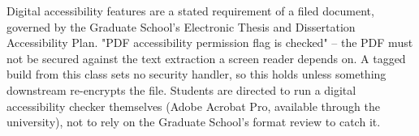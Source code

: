 %
%


\thesisrequiretagging
\thesisrequiredocumentlanguage
{}
	{Digital accessibility features are a stated requirement of a filed
	 document, governed by the Graduate School's Electronic Thesis and
	 Dissertation Accessibility Plan.}
	{"PDF accessibility permission flag is checked" -- the PDF must not be
	 secured against the text extraction a screen reader depends on. A tagged
	 build from this class sets no security handler, so this holds unless
	 something downstream re-encrypts the file.}
	{Students are directed to run a digital accessibility checker themselves
	 (Adobe Acrobat Pro, available through the university), not to rely on the
	 Graduate School's format review to catch it.}
